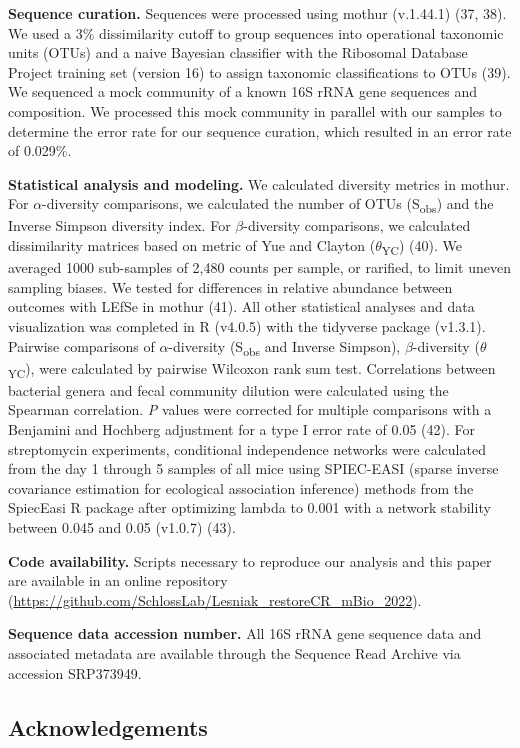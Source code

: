 \documentclass[
  12pt,
]{article}
\begin{document}
\textbf{Sequence curation.} Sequences were processed using mothur
(v.1.44.1) (37, 38). We used a 3\% dissimilarity cutoff to group
sequences into operational taxonomic units (OTUs) and a naive Bayesian
classifier with the Ribosomal Database Project training set (version 16)
to assign taxonomic classifications to OTUs (39). We sequenced a mock
community of a known 16S rRNA gene sequences and composition. We
processed this mock community in parallel with our samples to determine
the error rate for our sequence curation, which resulted in an error
rate of 0.029\%.

\textbf{Statistical analysis and modeling.} We calculated diversity
metrics in mothur. For \(\alpha\)-diversity comparisons, we calculated
the number of OTUs (S\textsubscript{obs}) and the Inverse Simpson
diversity index. For \(\beta\)-diversity comparisons, we calculated
dissimilarity matrices based on metric of Yue and Clayton
(\(\theta\)\textsubscript{YC}) (40). We averaged 1000 sub-samples of
2,480 counts per sample, or rarified, to limit uneven sampling biases.
We tested for differences in relative abundance between outcomes with
LEfSe in mothur (41). All other statistical analyses and data
visualization was completed in R (v4.0.5) with the tidyverse package
(v1.3.1). Pairwise comparisons of \(\alpha\)-diversity
(S\textsubscript{obs} and Inverse Simpson), \(\beta\)-diversity
(\(\theta\)\textsubscript{YC}), were calculated by pairwise Wilcoxon
rank sum test. Correlations between bacterial genera and fecal community
dilution were calculated using the Spearman correlation. \emph{P} values
were corrected for multiple comparisons with a Benjamini and Hochberg
adjustment for a type I error rate of 0.05 (42). For streptomycin
experiments, conditional independence networks were calculated from the
day 1 through 5 samples of all mice using SPIEC-EASI (sparse inverse
covariance estimation for ecological association inference) methods from
the SpiecEasi R package after optimizing lambda to 0.001 with a network
stability between 0.045 and 0.05 (v1.0.7) (43).

\textbf{Code availability.} Scripts necessary to reproduce our analysis
and this paper are available in an online repository
(\url{https://github.com/SchlossLab/Lesniak_restoreCR_mBio_2022}).

\textbf{Sequence data accession number.} All 16S rRNA gene sequence data
and associated metadata are available through the Sequence Read Archive
via accession SRP373949.

\hypertarget{acknowledgements}{%
\subsection{Acknowledgements}\label{acknowledgements}}
\end{document}
